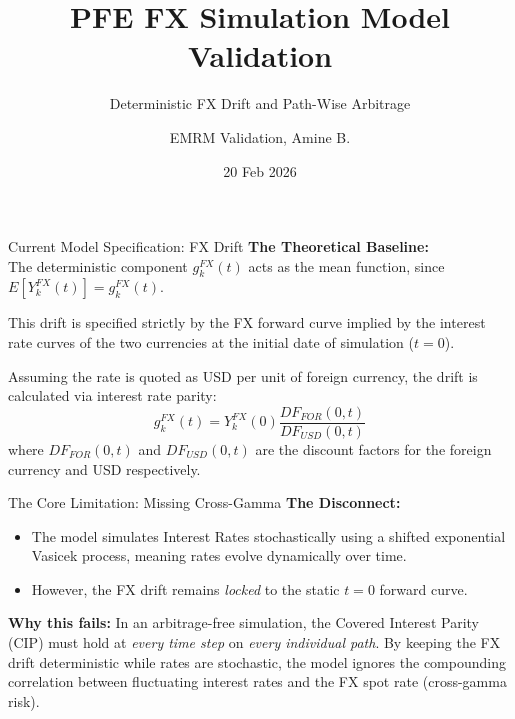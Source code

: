 \documentclass{beamer}
\title{PFE FX Simulation Model Validation}
\subtitle{Deterministic FX Drift and Path-Wise Arbitrage}
\author{EMRM Validation, Amine B.}
\date{20 Feb 2026}
\begin{document}
	
	\begin{frame}
		\titlepage
	\end{frame}
	
	\begin{frame}{Current Model Specification: FX Drift}
		\textbf{The Theoretical Baseline:} \\
		The deterministic component $g_k^{FX}(t)$ acts as the mean function, since $E[Y_k^{FX}(t)] = g_k^{FX}(t)$. 
		
		\vspace{0.5cm}
		This drift is specified strictly by the FX forward curve implied by the interest rate curves of the two currencies at the initial date of simulation ($t=0$).
		
		\vspace{0.5cm}
		Assuming the rate is quoted as USD per unit of foreign currency, the drift is calculated via interest rate parity:
		$$g_k^{FX}(t) = Y_k^{FX}(0) \frac{DF_{FOR}(0,t)}{DF_{USD}(0,t)}$$
		where $DF_{FOR}(0,t)$ and $DF_{USD}(0,t)$ are the discount factors for the foreign currency and USD respectively.
	\end{frame}
	
	\begin{frame}{The Core Limitation: Missing Cross-Gamma}
		\textbf{The Disconnect:}
		\begin{itemize}
			\item The model simulates Interest Rates stochastically using a shifted exponential Vasicek process, meaning rates evolve dynamically over time.
			\item However, the FX drift remains \textit{locked} to the static $t=0$ forward curve.
		\end{itemize}
		
		\vspace{0.5cm}
		\textbf{Why this fails:}
		In an arbitrage-free simulation, the Covered Interest Parity (CIP) must hold at \textit{every time step} on \textit{every individual path}. By keeping the FX drift deterministic while rates are stochastic, the model ignores the compounding correlation between fluctuating interest rates and the FX spot rate (cross-gamma risk).
	\end{frame}
	
\end{document}
